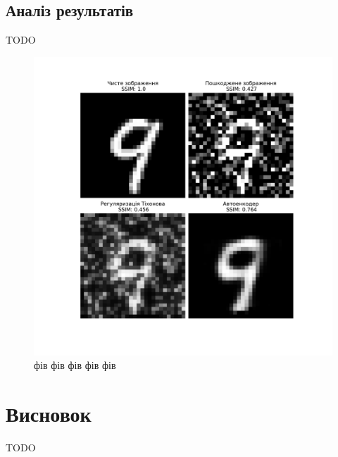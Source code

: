\documentclass[14pt,a4paper]{extarticle}
\newcounter{e}
\numberwithin{equation}{section}
\numberwithin{figure}{section}
\begin{document}

	\subsection{Аналіз результатів}	
	TODO
	\begin{figure}[H]
		\centering
		\includegraphics[width=1\textwidth]{resources/denoising_methods_comparation.pdf}
		\caption{фів фів фів фів фів}
		\label{fig:denoising-methods-comparation}
	\end{figure}
		
	\newpage
	\thispagestyle{empty}
	\section{Висновок}
	TODO
	
	\newpage
	\thispagestyle{empty}
	
	\nocite{ongie2020deep}
	\nocite{Goodfellow-et-al-2016}
	\nocite{Adler_2017}
	\nocite{NIPS2012_6cdd60ea}
	\nocite{raj2019ganbased}
	\nocite{Aggarwal_2019}
	\printbibliography[title={Бібліографія}]
\end{document}
